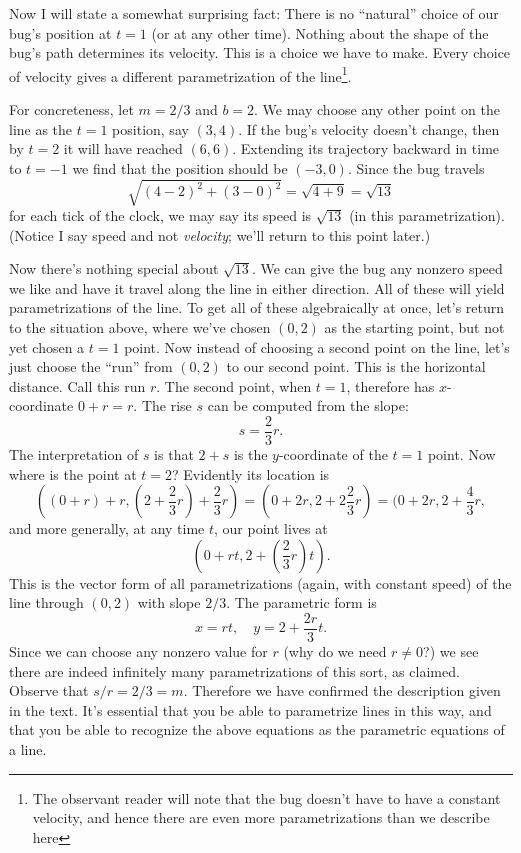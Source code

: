 \documentclass[justified]{tufte-handout}
\begin{document}
Now I will state a somewhat surprising fact: There is no ``natural'' choice of our bug's position at $t = 1$ (or at any other time). Nothing about the shape of the bug's path determines its velocity. This is a choice we have to make. Every choice of velocity gives a different parametrization of the line\footnote{The observant reader will note that the bug doesn't have to have a constant velocity, and hence there are even more parametrizations than we describe here}.

For concreteness, let $m = 2/3$ and $b = 2$. We may choose any other point on the line as the $t = 1$ position, say $(3,4)$. If the bug's velocity doesn't change, then by $t = 2$ it will have reached $(6,6)$. Extending its trajectory backward in time to $t = -1$ we find that the position should be $(-3,0)$. Since the bug travels
\[ 
 	\sqrt{(4-2)^2 + (3-0)^2} = \sqrt{4+9} = \sqrt{13}
\]
for each tick of the clock, we may say its speed is $\sqrt{13}$ (in this parametrization). (Notice I say speed and not \emph{velocity}; we'll return to this point later.)

Now there's nothing special about $\sqrt{13}$. We can give the bug any nonzero speed we like and have it travel along the line in either direction. All of these will yield parametrizations of the line. To get all of these algebraically at once, let's return to the situation above, where we've chosen $(0,2)$ as the starting point, but not yet chosen a $t = 1$ point. Now instead of choosing a second point on the line, let's just choose the ``run'' from $(0,2)$ to our second point. This is the horizontal distance. Call this run $r$. The second point, when $t = 1$, therefore has $x$-coordinate $0 + r = r$. The rise $s$ can be computed from the slope:
\[
	s = \frac{2}{3} r.
\]
The interpretation of $s$ is that $2 + s$ is the $y$-coordinate of the $t = 1$ point. Now where is the point at $t = 2$? Evidently its location is
\[
	((0+r)+r,(2+\frac{2}{3} r)+\frac{2}{3} r) = (0+2r,2+2\frac{2}{3} r) = (0+2r,2+\frac{4}{3} r,
\]
and more generally, at any time $t$, our point lives at
\[
	(0+rt,2+(\frac{2}{3}r)t).
\]
This is the vector form of all parametrizations (again, with constant speed) of the line through $(0,2)$ with slope $2/3$. The parametric form is
\[
	x = rt, \quad y = 2 + \frac{2r}{3}t.
\]
Since we can choose any nonzero value for $r$ (why do we need $r \ne 0$?) we see there are indeed infinitely many parametrizations of this sort, as claimed. Observe that $s/r = 2/3 = m$. Therefore we have confirmed the description given in the text. It's essential that you be able to parametrize lines in this way, and that you be able to recognize the above equations as the parametric equations of a line.
\end{document}
